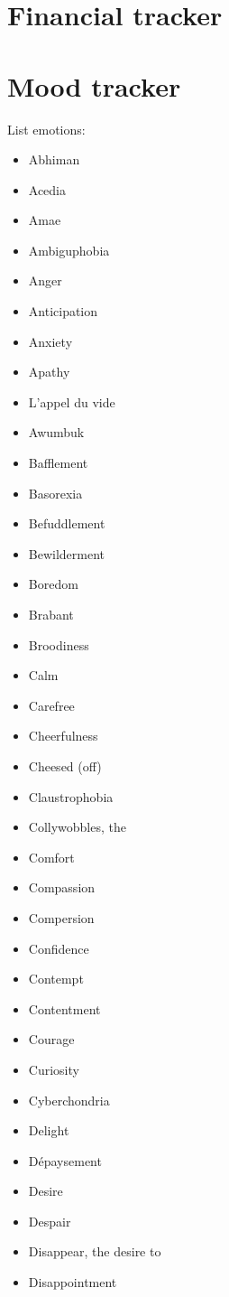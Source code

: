 \documentclass[a5paper]{article}
\begin{document}
\section{Financial tracker}

\section{Mood tracker}
List emotions:
\begin{itemize}
	\item Abhiman
	\item Acedia
	\item Amae
	\item Ambiguphobia
	\item Anger
	\item Anticipation
	\item Anxiety
	\item Apathy
	\item L’appel du vide
	\item Awumbuk
	\item Bafflement
	\item Basorexia
	\item Befuddlement
	\item Bewilderment
	\item Boredom
	\item Brabant
	\item Broodiness
	\item Calm
	\item Carefree
	\item Cheerfulness
	\item Cheesed (off)
	\item Claustrophobia
	\item Collywobbles, the
	\item Comfort
	\item Compassion
	\item Compersion
	\item Confidence
	\item Contempt
	\item Contentment
	\item Courage
	\item Curiosity
	\item Cyberchondria
	\item Delight
	\item Dépaysement
	\item Desire
	\item Despair
	\item Disappear, the desire to
	\item Disappointment

\end{itemize}
\end{document}
